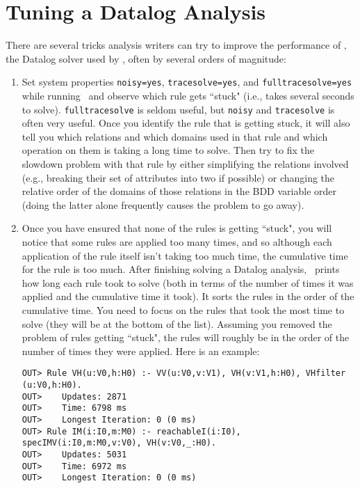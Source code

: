 \section{Tuning a Datalog Analysis}
\label{sec:tuning-datalog-analysis}

There are several tricks analysis writers can try to improve the
performance of \bddbddb, the Datalog solver used by \Chord, often
by several orders of magnitude:

\begin{enumerate}
\item
Set system properties \verb+noisy=yes+, \verb+tracesolve=yes+, and \verb+fulltracesolve=yes+
while running \bddbddb\ and observe which rule gets ``stuck" (i.e., takes several seconds to solve).
\verb+fulltracesolve+ is seldom useful, but \verb+noisy+ and \verb+tracesolve+ is
often very useful.  Once you identify the rule that is getting stuck, it
will also tell you which relations and which domains used in that rule
and which operation on them is taking a long time to solve.  Then try
to fix the slowdown problem with that rule by either simplifying the
relations involved (e.g., breaking their set of attributes into two if
possible) or changing the relative order of the domains of those
relations in the BDD variable order (doing the latter alone
frequently causes the problem to go away).

\item
Once you have ensured that none of the rules is getting ``stuck",
you will notice that some rules are applied too many times, and so
although each application of the rule itself isn't taking too much
time, the cumulative time for the rule is too much.  After finishing
solving a Datalog analysis, \bddbddb\ prints how long each rule took to
solve (both in terms of the number of times it was applied and the
cumulative time it took).  It sorts the rules in the order of the
cumulative time.  You need to focus on the rules that took the most
time to solve (they will be at the bottom of the list).  Assuming you
removed the problem of rules getting ``stuck", the rules will roughly
be in the order of the number of times they were applied.  Here is an
example:

\begin{verbatim}
OUT> Rule VH(u:V0,h:H0) :- VV(u:V0,v:V1), VH(v:V1,h:H0), VHfilter
(u:V0,h:H0).
OUT>    Updates: 2871
OUT>    Time: 6798 ms
OUT>    Longest Iteration: 0 (0 ms)
OUT> Rule IM(i:I0,m:M0) :- reachableI(i:I0), specIMV(i:I0,m:M0,v:V0), VH(v:V0,_:H0).
OUT>    Updates: 5031
OUT>    Time: 6972 ms
OUT>    Longest Iteration: 0 (0 ms)
\end{verbatim}


\end{enumerate}
